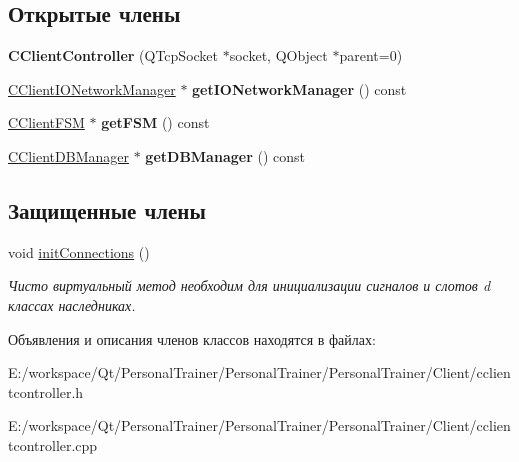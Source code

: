 \subsection*{Открытые члены}
\begin{DoxyCompactItemize}
\item 
\hypertarget{class_c_client_controller_a95dd0dfe547a620dee2ae10790dee6be}{}\label{class_c_client_controller_a95dd0dfe547a620dee2ae10790dee6be} 
{\bfseries C\+Client\+Controller} (Q\+Tcp\+Socket $\ast$socket, Q\+Object $\ast$parent=0)
\item 
\hypertarget{class_c_client_controller_ab39fa71b009189acc06aa759d636de4d}{}\label{class_c_client_controller_ab39fa71b009189acc06aa759d636de4d} 
\hyperlink{class_c_client_i_o_network_manager}{C\+Client\+I\+O\+Network\+Manager} $\ast$ {\bfseries get\+I\+O\+Network\+Manager} () const
\item 
\hypertarget{class_c_client_controller_a07441870867b13d7c867e57244101f92}{}\label{class_c_client_controller_a07441870867b13d7c867e57244101f92} 
\hyperlink{class_c_client_f_s_m}{C\+Client\+F\+SM} $\ast$ {\bfseries get\+F\+SM} () const
\item 
\hypertarget{class_c_client_controller_a456359547ec2e4225d54daeb6463008b}{}\label{class_c_client_controller_a456359547ec2e4225d54daeb6463008b} 
\hyperlink{class_c_client_d_b_manager}{C\+Client\+D\+B\+Manager} $\ast$ {\bfseries get\+D\+B\+Manager} () const
\end{DoxyCompactItemize}
\subsection*{Защищенные члены}
\begin{DoxyCompactItemize}
\item 
\hypertarget{class_c_client_controller_a1dabfbc538daf66f1c2565808bc7db6d}{}\label{class_c_client_controller_a1dabfbc538daf66f1c2565808bc7db6d} 
void \hyperlink{class_c_client_controller_a1dabfbc538daf66f1c2565808bc7db6d}{init\+Connections} ()
\begin{DoxyCompactList}\small\item\em Чисто виртуальный метод необходим для инициализации сигналов и слотов d классах наследниках. \end{DoxyCompactList}\end{DoxyCompactItemize}


Объявления и описания членов классов находятся в файлах\+:\begin{DoxyCompactItemize}
\item 
E\+:/workspace/\+Qt/\+Personal\+Trainer/\+Personal\+Trainer/\+Personal\+Trainer/\+Client/cclientcontroller.\+h\item 
E\+:/workspace/\+Qt/\+Personal\+Trainer/\+Personal\+Trainer/\+Personal\+Trainer/\+Client/cclientcontroller.\+cpp\end{DoxyCompactItemize}
